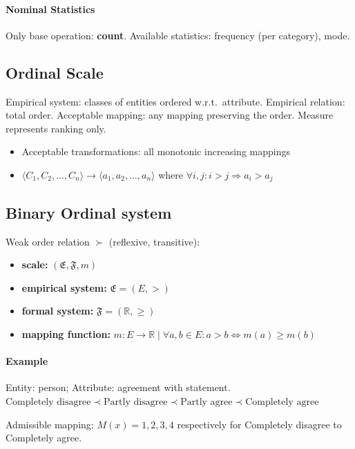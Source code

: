 \paragraph{Nominal Statistics}
Only base operation: \textbf{count}. Available statistics: frequency (per category), mode.

\subsection{Ordinal Scale}

Empirical system: classes of entities ordered w.r.t.\ attribute. Empirical relation: total order.
Acceptable mapping: any mapping preserving the order. Measure represents ranking only.
\begin{itemize}
  \item Acceptable transformations: all monotonic increasing mappings
  \item $\langle C_1, C_2, \ldots, C_n \rangle \to \langle a_1, a_2, \ldots, a_n \rangle$
        where $\forall i, j : i > j \Rightarrow a_i > a_j$
\end{itemize}

\subsection{Binary Ordinal system}


Weak order relation $\succ$ (reflexive, transitive):

\begin{itemize}
  \item \textbf{scale:} $(\mathfrak{E},\mathfrak{F},m)$
  \item \textbf{empirical system:} $\mathfrak{E}=(E,>)$
  \item \textbf{formal system:} $\mathfrak{F}=(\mathbb{R},\ge)$
  \item \textbf{mapping function:} $m:E\rightarrow\mathbb{R} \mid \forall a,b\in E:a>b\iff m(a)\ge m(b)$
\end{itemize}

\paragraph{Example}
Entity: person; Attribute: agreement with statement.
$\text{Completely disagree} \prec \text{Partly disagree} \prec \text{Partly agree} \prec \text{Completely agree}$



\vspace{1cm}
Admissible mapping: $M(x) = 1, 2, 3, 4$ respectively for Completely disagree to Completely agree.

